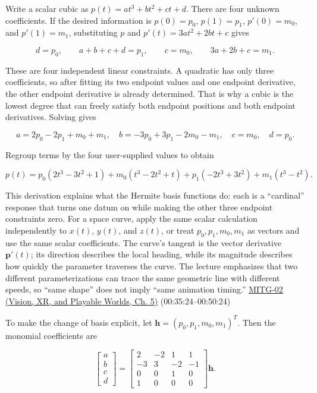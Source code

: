 \hypertarget{03-visual-computing-i-ch001-why-endpoint-data-needs-a-cubic-and-how-the-conversion-works}{}

Write a scalar cubic as \(p(t)=at^3+bt^2+ct+d\). There are four unknown coefficients. If the desired information is \(p(0)=p_0\), \(p(1)=p_1\), \(p'(0)=m_0\), and \(p'(1)=m_1\), substituting \(p\) and \(p'(t)=3at^2+2bt+c\) gives

\[
d=p_0,\qquad a+b+c+d=p_1,\qquad c=m_0,\qquad 3a+2b+c=m_1.
\]

These are four independent linear constraints. A quadratic has only three coefficients, so after fitting its two endpoint values and one endpoint derivative, the other endpoint derivative is already determined. That is why a cubic is the lowest degree that can freely satisfy both endpoint positions and both endpoint derivatives. Solving gives

\[
a=2p_0-2p_1+m_0+m_1,\quad
b=-3p_0+3p_1-2m_0-m_1,\quad
c=m_0,\quad d=p_0.
\]

Regroup terms by the four user-supplied values to obtain

\[
p(t)=p_0(2t^3-3t^2+1)+m_0(t^3-2t^2+t)+p_1(-2t^3+3t^2)+m_1(t^3-t^2).
\]

This derivation explains what the Hermite basis functions do: each is a ``cardinal'' response that turns one datum on while making the other three endpoint constraints zero. For a space curve, apply the same scalar calculation independently to \(x(t)\), \(y(t)\), and \(z(t)\), or treat \(p_0,p_1,m_0,m_1\) as vectors and use the same scalar coefficients. The curve's tangent is the vector derivative \(\boldsymbol{p}'(t)\); its direction describes the local heading, while its magnitude describes how quickly the parameter traverses the curve. The lecture emphasizes that two different parameterizations can trace the same geometric line with different speeds, so ``same shape'' does not imply ``same animation timing.'' \href{../07-Vision-XR-and-Playable-Worlds/main.pdf\#nameddest=04-visual-computing-ii-ch036-mitg-02---cubic-curves}{MITG-02 (Vision, XR, and Playable Worlds, Ch. 5)} (00:35:24--00:50:24)

To make the change of basis explicit, let \(\mathbf{h}=(p_0,p_1,m_0,m_1)^T\). Then the monomial coefficients are

\[
\begin{bmatrix}a\\b\\c\\d\end{bmatrix}=
\begin{bmatrix}
2&-2&1&1\\
-3&3&-2&-1\\
0&0&1&0\\
1&0&0&0
\end{bmatrix}\mathbf{h}.
\]

